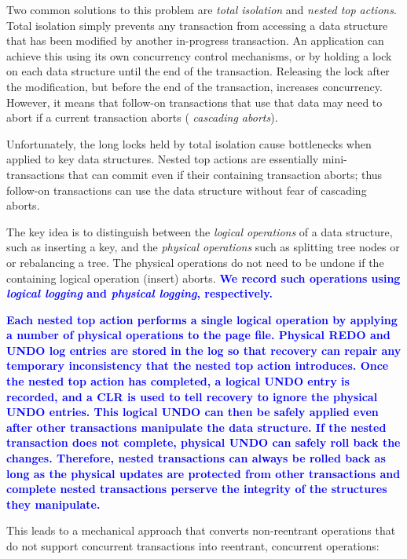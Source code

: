 \documentclass[letterpaper,twocolumn,10pt]{article}
\newcommand{\diff}[1]{\textcolor{blue}{\bf #1}}
\begin{document}
Two common solutions to this problem are {\em total isolation} and
{\em nested top actions}.  Total isolation simply prevents any
transaction from accessing a data structure that has been modified by
another in-progress transaction.  An application can achieve this
using its own concurrency control mechanisms, or by holding a lock on
each data structure until the end of the transaction.  Releasing the
lock after the modification, but before the end of the transaction,
increases concurrency.  However, it means that follow-on transactions that use
that data may need to abort if a current transaction aborts ({\em
cascading aborts}).  %

Unfortunately, the long locks held by total isolation cause bottlenecks when applied to key
data structures.
Nested top actions are essentially mini-transactions that can
commit even if their containing transaction aborts; thus follow-on
transactions can use the data structure without fear of cascading
aborts.  

The key idea is to distinguish between the {\em logical operations} of a
data structure, such as inserting a key, and the {\em physical operations}
such as splitting tree nodes or or rebalancing a tree. The physical
operations do not need to be undone if the containing logical operation
(insert) aborts.  \diff{We record such operations using {\em logical 
logging} and {\em physical logging}, respectively.}

\diff{Each nested top action performs a single logical operation by
applying a number of physical operations to the page file.  Physical
REDO and UNDO log entries are stored in the log so that recovery can
repair any temporary inconsistency that the nested top action
introduces.  Once the nested top action has completed, a logical UNDO
entry is recorded, and a CLR is used to tell recovery to ignore the
physical UNDO entries.  This logical UNDO can then be safely applied
even after other transactions manipulate the data structure.  If the
nested transaction does not complete, physical UNDO can safely roll
back the changes.  Therefore, nested transactions can always be rolled
back as long as the physical updates are protected from other
transactions and complete nested transactions perserve the integrity
of the structures they manipulate.}

This leads to a mechanical approach that converts non-reentrant
operations that do not support concurrent transactions into reentrant,
concurrent operations:
\end{document}
